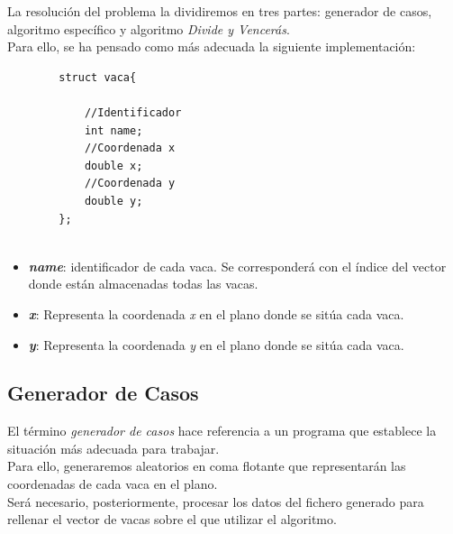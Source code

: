 \documentclass[a4paper,12pt,twoside]{article} %
\begin{document}
La resolución del problema la dividiremos en tres partes: generador de casos, algoritmo específico y algoritmo \textit{Divide y Vencerás}.\\

Para ello, se ha pensado como más adecuada la siguiente implementación:\\

\lstset{language=C++}
\begin{lstlisting}
		struct vaca{
		
		    //Identificador
		    int name;
		    //Coordenada x
		    double x;
		    //Coordenada y
		    double y;
		};
	
\end{lstlisting}

\begin{itemize}
	\item \textbf{\textit{name}}: identificador de cada vaca. Se corresponderá con el índice del vector donde están almacenadas todas las vacas.
	\item \textbf{\textit{x}}: Representa la coordenada \textit{x} en el plano donde se sitúa cada vaca.
	\item \textbf{\textit{y}}: Representa la coordenada \textit{y} en el plano donde se sitúa cada vaca.

\end{itemize}

\newpage

\subsection{Generador de Casos}

El término \textit{generador de casos} hace referencia a un programa que establece la situación más adecuada para trabajar.\\

Para ello, generaremos aleatorios en coma flotante que representarán las coordenadas de cada vaca en el plano.\\

Será necesario, posteriormente, procesar los datos del fichero generado para rellenar el vector de vacas sobre el que utilizar el algoritmo.
\end{document}
